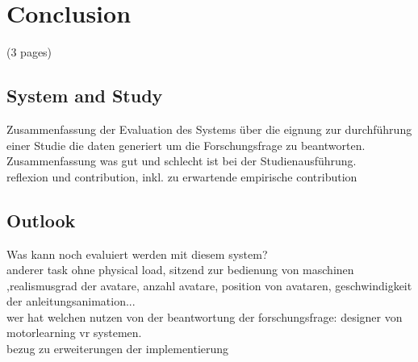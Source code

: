 \chapter{Conclusion}
(3 pages)
\section{System and Study}
Zusammenfassung der Evaluation des Systems über die eignung zur durchführung einer Studie die daten generiert um die Forschungsfrage zu beantworten.\\
Zusammenfassung was gut und schlecht ist bei der Studienausführung.\\
reflexion und contribution, inkl. zu erwartende empirische contribution\\
\section{Outlook}
Was kann noch evaluiert werden mit diesem system?\\
anderer task ohne physical load, sitzend zur bedienung von maschinen ,realismusgrad der avatare, anzahl avatare, position von avataren, geschwindigkeit der anleitungsanimation...\\
wer hat welchen nutzen von der beantwortung der forschungsfrage: designer von motorlearning vr systemen.\\
bezug zu erweiterungen der implementierung\\